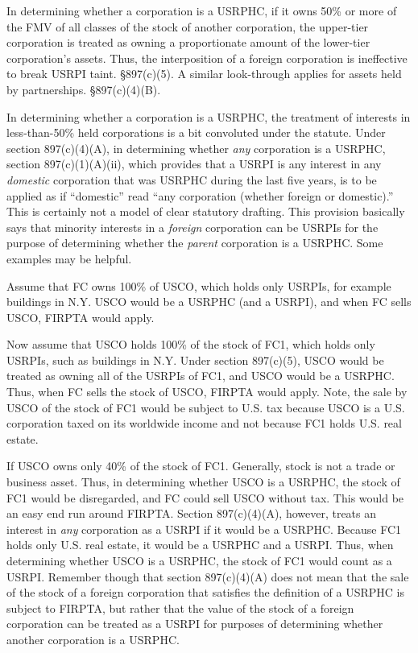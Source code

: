 In determining whether a  corporation is a USRPHC, if it owns 50\% or more of the FMV of all classes of the stock of another corporation, the upper-tier corporation is treated as owning a proportionate amount of the lower-tier corporation's assets.  Thus, the interposition of a foreign corporation is ineffective to break USRPI taint.  \S 897(c)(5).  A similar look-through applies for assets held by partnerships.  \S 897(c)(4)(B).

In determining whether a corporation is a USRPHC, the treatment of interests in less-than-50\% held corporations is a bit convoluted under the statute.  Under section 897(c)(4)(A), in determining whether \emph{any} corporation is a USRPHC, section 897(c)(1)(A)(ii), which provides that a USRPI is any interest in any \emph{domestic} corporation that was USRPHC during the last five years, is to be applied as if ``domestic'' read ``any corporation (whether foreign or domestic).''  This is certainly not a model of clear statutory drafting.  This provision basically says that minority interests in a \emph{foreign} corporation can be USRPIs for the purpose of determining whether the \emph{parent} corporation is a USRPHC.  Some examples may be helpful.

Assume that FC owns 100\% of USCO, which holds only USRPIs, for example buildings in N.Y.  USCO would be a USRPHC (and a USRPI), and when FC sells USCO, FIRPTA would apply.  

Now assume that USCO holds 100\% of the stock of FC1, which holds only USRPIs, such as  buildings in N.Y.  Under section 897(c)(5), USCO would be treated as owning all of the USRPIs of FC1, and USCO would be a USRPHC.  Thus, when FC sells the stock of USCO, FIRPTA would apply.  Note, the sale by USCO of the stock of FC1 would be subject to U.S. tax because USCO is a U.S. corporation taxed on its worldwide income and not because FC1 holds U.S. real estate. 

If USCO owns only 40\% of the stock of FC1.   Generally, stock is not a trade or business asset.  Thus, in determining whether USCO is a USRPHC, the stock of FC1 would be disregarded, and FC could sell USCO without tax.  This would be an easy end run around FIRPTA.  Section 897(c)(4)(A), however, treats an interest in \emph{any} corporation as a USRPI if it would be a USRPHC.  Because FC1 holds only U.S. real estate, it would be a USRPHC and a USRPI.  Thus, when determining whether USCO is a USRPHC, the stock of FC1 would count as a USRPI.  Remember though that section 897(c)(4)(A) does not mean that the sale of the stock of a foreign corporation that satisfies the definition of a USRPHC is subject to FIRPTA, but rather that the value of the stock of a foreign corporation can be treated as a USRPI for purposes of determining whether another corporation is a USRPHC.

